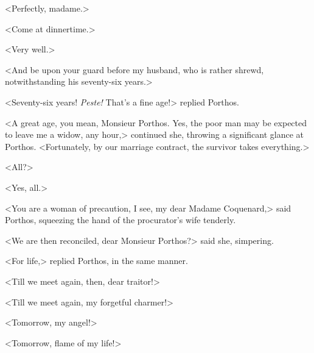 <Perfectly, madame.> 

<Come at dinnertime.> 

<Very well.> 

<And be upon your guard before my husband, who is rather shrewd, notwithstanding his seventy-six years.> 

<Seventy-six years! \textit{Peste!} That's a fine age!> replied Porthos. 

<A great age, you mean, Monsieur Porthos. Yes, the poor man may be expected to leave me a widow, any hour,> continued she, throwing a significant glance at Porthos. <Fortunately, by our marriage contract, the survivor takes everything.> 

<All?> 

<Yes, all.> 

<You are a woman of precaution, I see, my dear Madame Coquenard,> said Porthos, squeezing the hand of the procurator's wife tenderly. 

<We are then reconciled, dear Monsieur Porthos?> said she, simpering. 

<For life,> replied Porthos, in the same manner. 

<Till we meet again, then, dear traitor!> 

<Till we meet again, my forgetful charmer!> 

<Tomorrow, my angel!> 

<Tomorrow, flame of my life!>
